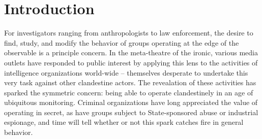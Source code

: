 \documentclass{article}
\begin{document}
% 
% 
% 
% 


\section*{Introduction}
For investigators ranging from anthropologists to law enforcement, the desire to find, study, and modify the behavior of groups operating at the edge of the observable is a principle concern.  In the meta-theatre of the ironic, various media outlets have responded to public interest by applying this lens to the activities of intelligence organizations world-wide -- themselves desperate to undertake this very task against other clandestine actors.  The revealation of these activities has sparked the symmetric concern: being able to operate clandestinely in an age of ubiquitous monitoring.  Criminal organizations have long appreciated the value of operating in secret, as have groups subject to State-sponsored abuse or industrial espionage, and time will tell whether or not this spark catches fire in general behavior.
\end{document}

